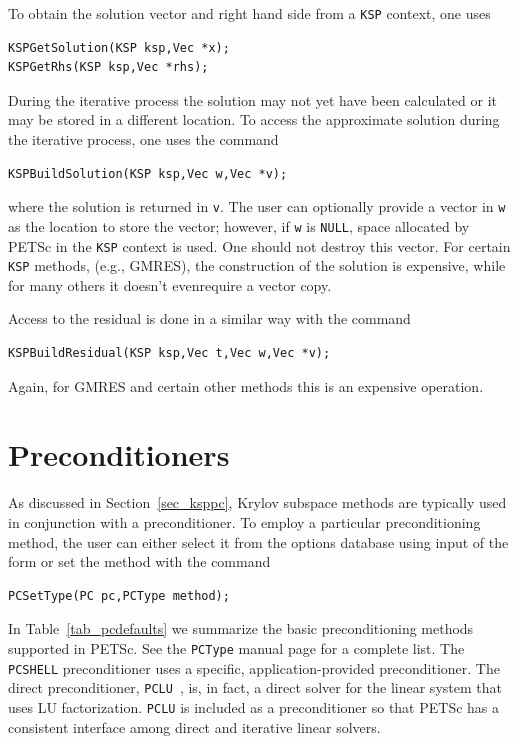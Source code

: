 To obtain the solution vector and right hand side from a \lstinline{KSP}
context, one uses
\begin{lstlisting}
KSPGetSolution(KSP ksp,Vec *x);
KSPGetRhs(KSP ksp,Vec *rhs);
\end{lstlisting}
During the iterative process
the solution may not yet have been calculated or it may be stored in
a different location. To access the approximate solution during the
iterative process, one uses the command
\begin{lstlisting}
KSPBuildSolution(KSP ksp,Vec w,Vec *v);
\end{lstlisting}
where the solution is returned in \lstinline{v}. The user can optionally provide
a vector in \lstinline{w} as the location to store the vector; however, if
\lstinline{w} is \lstinline{NULL}, space allocated by PETSc in the \lstinline{KSP} context is
used. One should not destroy this vector. For certain \lstinline{KSP} methods,
(e.g., GMRES), the construction of the solution is expensive, while for many
others it doesn't evenrequire a vector copy.

Access to the residual is done in a similar way with the
command
\begin{lstlisting}
KSPBuildResidual(KSP ksp,Vec t,Vec w,Vec *v);
\end{lstlisting}
Again, for GMRES and certain other methods this is an expensive
operation.

\section{Preconditioners} 
\label{sec_pc}

As discussed in Section~\ref{sec_ksppc}, Krylov subspace methods are
typically used in conjunction with a preconditioner.
To employ a particular preconditioning method, the user can either select
it from the options database using input of the form
 or set the method with the
command 
\begin{lstlisting}
PCSetType(PC pc,PCType method);
\end{lstlisting}
In Table~\ref{tab_pcdefaults} we summarize the basic
preconditioning methods supported in PETSc. See the \lstinline{PCType} manual page for a complete list.
The \lstinline{PCSHELL} preconditioner uses a specific,
application-provided preconditioner.  The direct preconditioner, \lstinline{PCLU}~,
is, in fact, a direct solver for the linear system that uses LU
factorization. \lstinline{PCLU} is included as a preconditioner so that PETSc has a
consistent interface among direct and iterative linear solvers.

